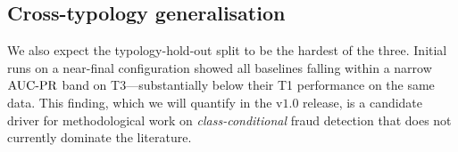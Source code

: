 \subsection{Cross-typology generalisation}
\label{sec:evaluation:cross}

We also expect the typology-hold-out split to be the hardest of
the three.  Initial runs on a near-final configuration showed all
baselines falling within a narrow $\operatorname{AUC\text{-}PR}$ band on T3---substantially
below their T1 performance on the same data.  This finding, which
we will quantify in the v$1.0$ release, is a candidate driver for
methodological work on \emph{class-conditional} fraud detection
that does not currently dominate the literature.

